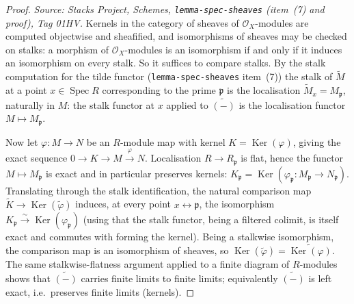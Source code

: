 \begin{proof}
  \textit{Source: Stacks Project, Schemes, \texttt{lemma-spec-sheaves} (item~(7) and
  proof), Tag 01HV.}
  Kernels in the category of sheaves of \(\mathcal{O}_X\)-modules are computed
  objectwise and sheafified, and isomorphisms of sheaves may be checked on stalks: a
  morphism of \(\mathcal{O}_X\)-modules is an isomorphism if and only if it induces an
  isomorphism on every stalk. So it suffices to compare stalks. By the stalk computation
  for the tilde functor (\texttt{lemma-spec-sheaves} item~(7)) the stalk of
  \(\widetilde{M}\) at a point \(x \in \operatorname{Spec} R\) corresponding to the prime
  \(\mathfrak{p}\) is the localisation
  \(\widetilde{M}_x = M_{\mathfrak{p}}\), naturally in \(M\): the stalk functor at \(x\)
  applied to \(\widetilde{(-)}\) is the localisation functor \(M \mapsto M_{\mathfrak{p}}\).

  Now let \(\varphi : M \to N\) be an \(R\)-module map with kernel
  \(K = \operatorname{Ker}(\varphi)\), giving the exact sequence
  \(0 \to K \to M \xrightarrow{\varphi} N\). Localisation \(R \to R_{\mathfrak{p}}\) is
  flat, hence the functor \(M \mapsto M_{\mathfrak{p}}\) is exact and in particular
  preserves kernels: \(K_{\mathfrak{p}} = \operatorname{Ker}(\varphi_{\mathfrak{p}} :
  M_{\mathfrak{p}} \to N_{\mathfrak{p}})\). Translating through the stalk identification,
  the natural comparison map
  \(\widetilde{K} \to \operatorname{Ker}(\widetilde{\varphi})\) induces, at every point
  \(x \leftrightarrow \mathfrak{p}\), the isomorphism \(K_{\mathfrak{p}} \xrightarrow{\sim}
  \operatorname{Ker}(\varphi_{\mathfrak{p}})\) (using that the stalk functor, being a
  filtered colimit, is itself exact and commutes with forming the kernel). Being a
  stalkwise isomorphism, the comparison map is an isomorphism of sheaves, so
  \(\operatorname{Ker}(\widetilde{\varphi}) = \widetilde{\operatorname{Ker}(\varphi)}\).
  The same stalkwise-flatness argument applied to a finite diagram of \(R\)-modules shows
  that \(\widetilde{(-)}\) carries finite limits to finite limits; equivalently
  \(\widetilde{(-)}\) is left exact, i.e.\ preserves finite limits (kernels).


\end{proof}
